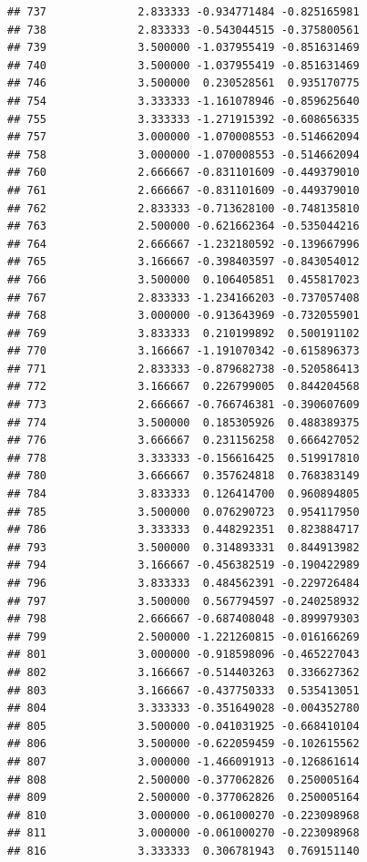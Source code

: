 \documentclass[
]{article}
\begin{document}
\begin{verbatim}
## 737              2.833333 -0.934771484 -0.825165981
## 738              2.833333 -0.543044515 -0.375800561
## 739              3.500000 -1.037955419 -0.851631469
## 740              3.500000 -1.037955419 -0.851631469
## 746              3.500000  0.230528561  0.935170775
## 754              3.333333 -1.161078946 -0.859625640
## 755              3.333333 -1.271915392 -0.608656335
## 757              3.000000 -1.070008553 -0.514662094
## 758              3.000000 -1.070008553 -0.514662094
## 760              2.666667 -0.831101609 -0.449379010
## 761              2.666667 -0.831101609 -0.449379010
## 762              2.833333 -0.713628100 -0.748135810
## 763              2.500000 -0.621662364 -0.535044216
## 764              2.666667 -1.232180592 -0.139667996
## 765              3.166667 -0.398403597 -0.843054012
## 766              3.500000  0.106405851  0.455817023
## 767              2.833333 -1.234166203 -0.737057408
## 768              3.000000 -0.913643969 -0.732055901
## 769              3.833333  0.210199892  0.500191102
## 770              3.166667 -1.191070342 -0.615896373
## 771              2.833333 -0.879682738 -0.520586413
## 772              3.166667  0.226799005  0.844204568
## 773              2.666667 -0.766746381 -0.390607609
## 774              3.500000  0.185305926  0.488389375
## 776              3.666667  0.231156258  0.666427052
## 778              3.333333 -0.156616425  0.519917810
## 780              3.666667  0.357624818  0.768383149
## 784              3.833333  0.126414700  0.960894805
## 785              3.500000  0.076290723  0.954117950
## 786              3.333333  0.448292351  0.823884717
## 793              3.500000  0.314893331  0.844913982
## 794              3.166667 -0.456382519 -0.190422989
## 796              3.833333  0.484562391 -0.229726484
## 797              3.500000  0.567794597 -0.240258932
## 798              2.666667 -0.687408048 -0.899979303
## 799              2.500000 -1.221260815 -0.016166269
## 801              3.000000 -0.918598096 -0.465227043
## 802              3.166667 -0.514403263  0.336627362
## 803              3.166667 -0.437750333  0.535413051
## 804              3.333333 -0.351649028 -0.004352780
## 805              3.500000 -0.041031925 -0.668410104
## 806              3.500000 -0.622059459 -0.102615562
## 807              3.000000 -1.466091913 -0.126861614
## 808              2.500000 -0.377062826  0.250005164
## 809              2.500000 -0.377062826  0.250005164
## 810              3.000000 -0.061000270 -0.223098968
## 811              3.000000 -0.061000270 -0.223098968
## 816              3.333333  0.306781943  0.769151140

\end{verbatim}
\end{document}

